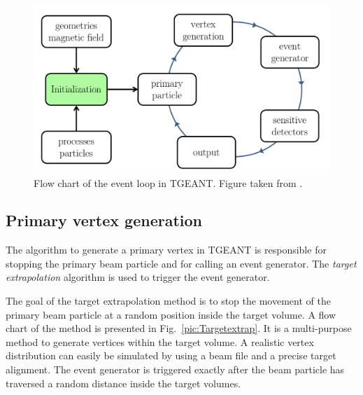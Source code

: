 \begin{figure}[!h]
  \centering
	\includegraphics[scale=0.5]{./gfx/EventLoop.png}
	\caption{Flow chart of the event loop in TGEANT. Figure taken from \cite{Tobias}.}
	\label{pic:EventLoop}
\end{figure}

\subsection{Primary vertex generation}

The algorithm to generate a primary vertex in TGEANT is responsible for stopping the primary beam particle and for calling an event generator. The \textit{target extrapolation} algorithm is used to trigger the event generator.

The goal of the target extrapolation method is to stop the movement of the primary beam particle at a random position inside the target volume. A flow chart of the method is presented in Fig.~\ref{pic:Targetextrap}. It is a multi-purpose method to generate vertices within the target volume. A realistic vertex distribution can easily be simulated by using a beam file and a precise target alignment. The event generator is triggered exactly after the beam particle has traversed a random distance inside the target volumes.

